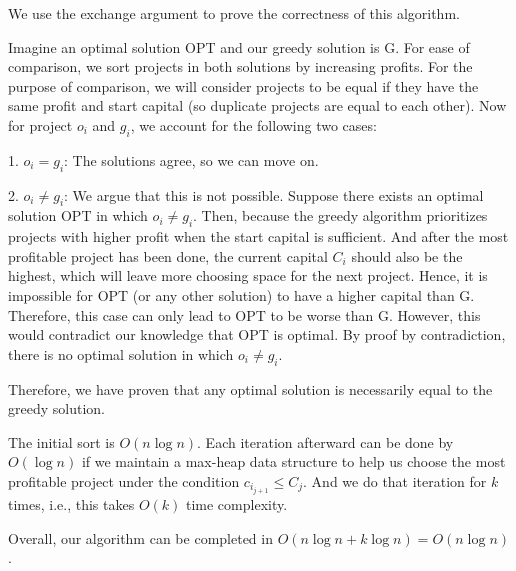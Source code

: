 



We use the exchange argument to prove the correctness of this algorithm.

Imagine an optimal solution OPT and our greedy solution is G. For ease of comparison, we sort projects in both solutions by increasing profits. For the purpose of comparison, we will consider projects to be equal if they have the same profit and start capital (so duplicate projects are equal to each other). Now for project $o_i$ and $g_i$, we account for the following two cases:

1. $o_i = g_i$: The solutions agree, so we can move on.

2. $o_i \neq g_i$: We argue that this is not possible. Suppose there exists an optimal solution OPT in which $o_i \neq g_i$. Then, because the greedy algorithm prioritizes projects with higher profit when the start capital is sufficient. And after the most profitable project has been done, the current capital $C_i$ should also be the highest, which will leave more choosing space for the next project. Hence, it is impossible for OPT (or any other solution) to have a higher capital than G. Therefore, this case can only lead to OPT to be worse than G. However, this would contradict our knowledge that OPT is optimal. By proof by contradiction, there is no optimal solution in which $o_i \neq g_i$.

Therefore, we have proven that any optimal solution is necessarily equal to the greedy solution. 


The initial sort is $O(n\log n)$. Each iteration afterward can be done by $O(\log n)$ if we maintain a max-heap data structure to help us choose the most profitable project under the condition $c_{i_{j+1}} \leq C_j$. And we do that iteration for $k$ times, i.e., this takes $O(k)$ time complexity. 

Overall, our algorithm can be completed in $O(n\log n+ k\log n)=O(n\log n)$.







